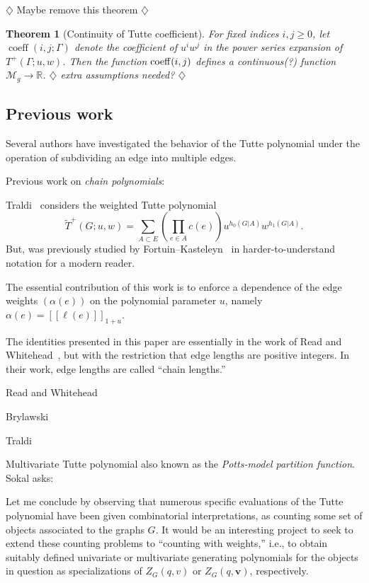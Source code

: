 \documentclass{amsart}
\newtheorem{thm}{Theorem}
\theoremstyle{definition}
\newcommand{\RR}{\mathbb{R}}
\DeclareMathOperator{\coeff}{coeff}
\newcommand{\fanalog}[2]{[\![#2]\!]_{#1}}
\newcommand{\harry}[1]{{\color{red} \sf $\diamondsuit$  {#1} $\diamondsuit$ }}
\newcommand{\note}[1]{\harry{#1}}
\begin{document}
\note{Maybe remove this theorem}
\begin{thm}[Continuity of Tutte coefficient]
For fixed indices $i,j\geq 0$,
let $\coeff(i,j; \Gamma)$
denote the coefficient of $u^i w^j$ in the power series expansion of $T^+(\Gamma; u,w)$.
Then the function ${\rm coeff}(i,j)$
defines a continuous(?) 
function $\mathcal M_g \to \RR$.
\note{extra assumptions needed?}
\end{thm}

\subsection{Previous work} 

Several authors have investigated the behavior of the Tutte polynomial under the operation of subdividing an edge into multiple edges.

Previous work on {\em chain polynomials}:

Traldi~\cite{Tra1} considers the weighted Tutte polynomial
\[
	\widetilde T^+(G; u,w) = \sum_{A \subset E} \left( \prod_{e \in A} c(e) \right) u^{h_0(G|A)} w^{h_1(G|A)} .
\]
But, was previously studied by Fortuin--Kasteleyn~\cite{FK} in harder-to-understand notation for a modern reader.

The essential contribution of this work is to enforce a dependence of the edge weights $(\alpha(e))$ on the polynomial parameter $u$, namely $\alpha(e) = \fanalog{1 + u}{\ell(e)}$.


The identities presented in this paper are essentially in the work of Read and Whitehead~\cite{RW2}, but with the restriction that edge lengths are positive integers. In their work, edge lengths are called ``chain lengths.''

Read and Whitehead \cite{RW2}
\cite{RW1,RW2}

Brylawski \cite{Bry}

Traldi \cite{Tra1,Tra2,Tra3}

Multivariate Tutte polynomial \cite{Sok-potts}
also known as the {\em Potts-model partition function}.
Sokal \cite{Sok-potts} asks:
\begin{displayquote}
Let me conclude by observing that numerous specific evaluations of the Tutte polynomial have been given combinatorial interpretations, 
as counting some set of objects associated to the graphs $G$. 
It would be an interesting project to seek to extend these counting problems to ``counting with weights,''
i.e., to obtain suitably defined univariate or multivariate generating polynomials for the objects in question as specializations of 
$Z_G(q,v)$ or $Z_G(q,\mathbf{v})$, respectively.
\end{displayquote}
\end{document}
